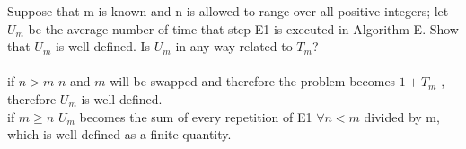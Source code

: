 \documentclass{article}
\begin{document}
Suppose that m is known and n is allowed to range over all positive integers;
let $U_m$ be the average number of time that step E1 is executed in Algorithm
E. Show that $U_m$ is well defined. Is $U_m$ in any way related to $T_m$?\\
\\
if $n > m$  $n$ and $m$ will be swapped and therefore the problem becomes
$1 + T_m$ ,  therefore $U_m$ is well defined.\\
if $ m \geq n$  $U_m$ becomes the sum of every repetition of E1 $\forall n < m$
divided by m, which is well defined as a finite quantity.
\end{document}
